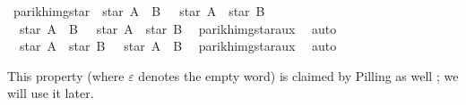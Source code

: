 \begin{isabellebody}
\isamarkupfalse%
%
\endisatagproof
{\isafoldproof}%
%
\isadelimproof
\isanewline
%
\endisadelimproof
\isanewline
{}\isamarkupfalse%
\ parikh{\isacharunderscore}{\kern0pt}img{\isacharunderscore}{\kern0pt}star{\isacharcolon}{\kern0pt}\ {\isachardoublequoteopen}{\isasymPsi}\ {\isacharparenleft}{\kern0pt}star\ {\isacharparenleft}{\kern0pt}A\ {\isasymunion}\ B{\isacharparenright}{\kern0pt}{\isacharparenright}{\kern0pt}\ {\isacharequal}{\kern0pt}\ {\isasymPsi}\ {\isacharparenleft}{\kern0pt}star\ A\ {\isacharat}{\kern0pt}{\isacharat}{\kern0pt}\ star\ B{\isacharparenright}{\kern0pt}{\isachardoublequoteclose}\isanewline
%
\isadelimproof
%
\endisadelimproof
%
\isatagproof
{}\isamarkupfalse%
\isanewline
\ \ \isamarkupfalse%
\ {\isachardoublequoteopen}{\isasymPsi}\ {\isacharparenleft}{\kern0pt}star\ {\isacharparenleft}{\kern0pt}A\ {\isasymunion}\ B{\isacharparenright}{\kern0pt}{\isacharparenright}{\kern0pt}\ {\isasymsubseteq}\ {\isasymPsi}\ {\isacharparenleft}{\kern0pt}star\ A\ {\isacharat}{\kern0pt}{\isacharat}{\kern0pt}\ star\ B{\isacharparenright}{\kern0pt}{\isachardoublequoteclose}\ \isamarkupfalse%
\ parikh{\isacharunderscore}{\kern0pt}img{\isacharunderscore}{\kern0pt}star{\isacharunderscore}{\kern0pt}aux{}\ \isamarkupfalse%
\ auto\isanewline
\ \ \isamarkupfalse%
\ {\isachardoublequoteopen}{\isasymPsi}\ {\isacharparenleft}{\kern0pt}star\ A\ {\isacharat}{\kern0pt}{\isacharat}{\kern0pt}\ star\ B{\isacharparenright}{\kern0pt}\ {\isasymsubseteq}\ {\isasymPsi}\ {\isacharparenleft}{\kern0pt}star\ {\isacharparenleft}{\kern0pt}A\ {\isasymunion}\ B{\isacharparenright}{\kern0pt}{\isacharparenright}{\kern0pt}{\isachardoublequoteclose}\ \isamarkupfalse%
\ parikh{\isacharunderscore}{\kern0pt}img{\isacharunderscore}{\kern0pt}star{\isacharunderscore}{\kern0pt}aux{}\ \isamarkupfalse%
\ auto\isanewline
{}\isamarkupfalse%
%
\endisatagproof
{\isafoldproof}%
%
\isadelimproof
%
\endisadelimproof
%
\isadelimdocument
%
\endisadelimdocument
%
\isatagdocument
%
\isamarkuptrue%
%
\endisatagdocument
{\isafolddocument}%
%
\isadelimdocument
%
\endisadelimdocument
%
\begin{isamarkuptext}%
This property (where $\varepsilon$ denotes the empty word) is claimed by
Pilling as well \cite{Pilling}; we will use it later.%
\end{isamarkuptext}\isamarkuptrue%

\end{isabellebody}
